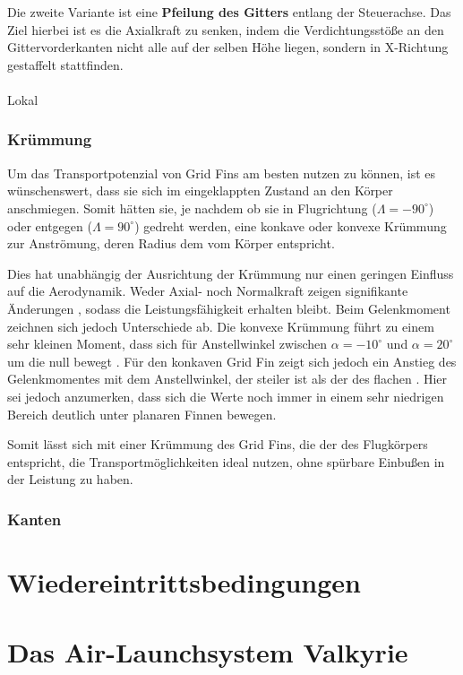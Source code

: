 Die zweite Variante ist eine \textbf{Pfeilung des Gitters} entlang der Steuerachse. Das Ziel hierbei ist es die Axialkraft zu senken, indem die Verdichtungsstöße an den Gittervorderkanten nicht alle auf der selben Höhe liegen, sondern in X-Richtung gestaffelt stattfinden.
\\
~\\
Lokal\\
\subsubsection{Krümmung}
Um das Transportpotenzial von Grid Fins am besten nutzen zu können, ist es wünschenswert, dass sie sich im eingeklappten Zustand an den Körper anschmiegen. Somit hätten sie, je nachdem ob sie in Flugrichtung ($\Lambda = -90^\circ$) oder entgegen ($\Lambda = 90^\circ$) gedreht werden, eine konkave oder konvexe Krümmung zur Anströmung, deren Radius dem vom Körper entspricht.

Dies hat unabhängig der Ausrichtung der Krümmung nur einen geringen Einfluss auf die Aerodynamik. Weder Axial- noch Normalkraft zeigen signifikante Änderungen \cite{LambdaKonf}, sodass die Leistungsfähigkeit erhalten bleibt. Beim Gelenkmoment zeichnen sich jedoch Unterschiede ab. Die konvexe Krümmung führt zu einem sehr kleinen Moment, dass sich für Anstellwinkel zwischen $\alpha = -10^\circ$ und $\alpha=20^\circ$ um die null bewegt \cite{LambdaKonf}. Für den konkaven Grid Fin zeigt sich jedoch ein Anstieg des Gelenkmomentes mit dem Anstellwinkel, der steiler ist als der des flachen \cite{LambdaKonf}. Hier sei jedoch anzumerken, dass sich die Werte noch immer in einem sehr niedrigen Bereich deutlich unter planaren Finnen bewegen.

Somit lässt sich mit einer Krümmung des Grid Fins, die der des Flugkörpers entspricht, die Transportmöglichkeiten ideal nutzen, ohne spürbare Einbußen in der Leistung zu haben.
\subsubsection{Kanten}


\section{Wiedereintrittsbedingungen}


\section{Das Air-Launchsystem Valkyrie}

